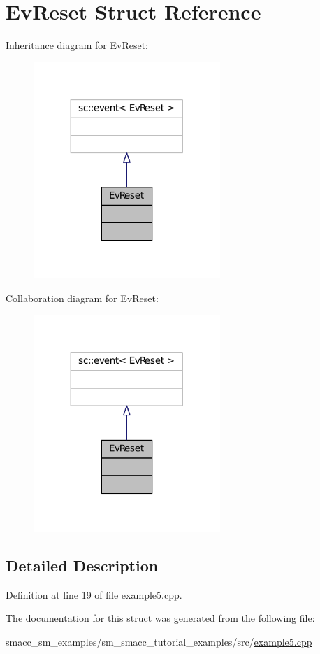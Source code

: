 \hypertarget{structEvReset}{}\section{Ev\+Reset Struct Reference}
\label{structEvReset}


Inheritance diagram for Ev\+Reset\+:
\nopagebreak
\begin{figure}[H]
\begin{center}
\leavevmode
\includegraphics[width=200pt]{structEvReset__inherit__graph}
\end{center}
\end{figure}


Collaboration diagram for Ev\+Reset\+:
\nopagebreak
\begin{figure}[H]
\begin{center}
\leavevmode
\includegraphics[width=200pt]{structEvReset__coll__graph}
\end{center}
\end{figure}


\subsection{Detailed Description}


Definition at line 19 of file example5.\+cpp.



The documentation for this struct was generated from the following file\+:\begin{DoxyCompactItemize}
\item 
smacc\+\_\+sm\+\_\+examples/sm\+\_\+smacc\+\_\+tutorial\+\_\+examples/src/\hyperlink{example5_8cpp}{example5.\+cpp}\end{DoxyCompactItemize}
